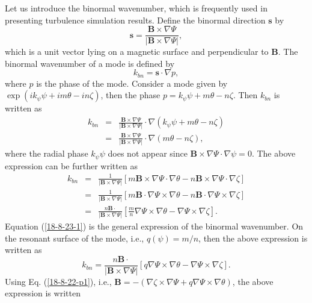 \documentclass{article}
\begin{document}
Let us introduce the binormal wavenumber, which is frequently used in
presenting turbulence simulation results. Define the binormal direction
$\mathbf{s}$ by
\[ \mathbf{s}= \frac{\mathbf{B} \times \nabla \Psi}{| \mathbf{B} \times \nabla
   \Psi |}, \]
which is a unit vector lying on a magnetic surface and perpendicular to
$\mathbf{B}$. The binormal wavenumber of a mode is defined by
\begin{equation}
  \label{18-5-4-p2} k_{b n} =\mathbf{s} \cdot \nabla p,
\end{equation}
where $p$ is the phase of the mode. Consider a mode given by $\exp (i k_{\psi}
\psi + i m \theta - i n \zeta)$, then the phase $p = k_{\psi} \psi + m \theta
- n \zeta$. Then $k_{b n}$ is written as
\begin{eqnarray}
  k_{b n} & = & \frac{\mathbf{B} \times \nabla \Psi}{| \mathbf{B} \times
  \nabla \Psi |} \cdot \nabla (k_{\psi} \psi + m \theta - n \zeta) \nonumber\\
  & = & \frac{\mathbf{B} \times \nabla \Psi}{| \mathbf{B} \times \nabla \Psi
  |} \cdot \nabla (m \theta - n \zeta), 
\end{eqnarray}
where the radial phase $k_{\psi} \psi$ does not appear since $\mathbf{B}
\times \nabla \Psi \cdot \nabla \psi = 0$. The above expression can be further
written as
\begin{eqnarray}
  k_{b n} & = & \frac{1}{| \mathbf{B} \times \nabla \Psi |} [m\mathbf{B}
  \times \nabla \Psi \cdot \nabla \theta - n\mathbf{B} \times \nabla \Psi
  \cdot \nabla \zeta] \nonumber\\
  & = & \frac{1}{| \mathbf{B} \times \nabla \Psi |} [m\mathbf{B} \cdot \nabla
  \Psi \times \nabla \theta - n\mathbf{B} \cdot \nabla \Psi \times \nabla
  \zeta] \nonumber\\
  & = & \frac{n\mathbf{B} \cdot}{| \mathbf{B} \times \nabla \Psi |} \left[
  \frac{m}{n} \nabla \Psi \times \nabla \theta - \nabla \Psi \times \nabla
  \zeta \right] .  \label{18-8-23-1}
\end{eqnarray}
Equation (\ref{18-8-23-1}) is the general expression of the binormal
wavenumber. On the resonant surface of the mode, i.e., $q (\psi) = m / n$,
then the above expression is written as
\begin{equation}
  k_{b n} = \frac{n\mathbf{B} \cdot}{| \mathbf{B} \times \nabla \Psi |} [q
  \nabla \Psi \times \nabla \theta - \nabla \Psi \times \nabla \zeta] .
\end{equation}
Using Eq. (\ref{18-8-22-p1}), i.e., $\mathbf{B}= - (\nabla \zeta \times \nabla
\Psi + q \nabla \Psi \times \nabla \theta)$, the above expression is written
\end{document}
